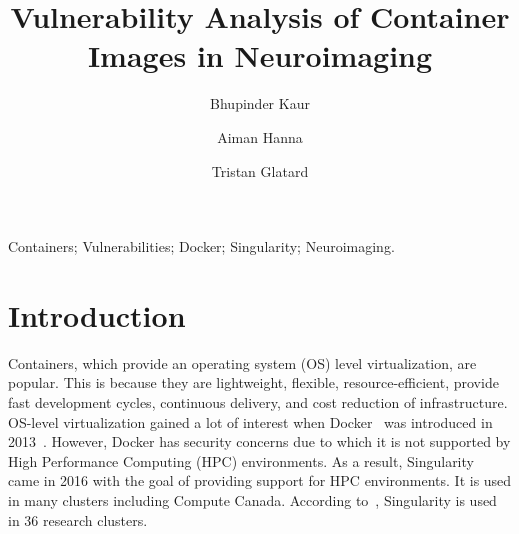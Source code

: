 \documentclass[a4paper,num-refs]{oup-contemporary}
\title{Vulnerability Analysis of Container Images in Neuroimaging}
\begin{document}
\author[1]{Bhupinder Kaur}
\author[1]{Aiman Hanna}
\author[1]{Tristan Glatard}


\maketitle

\begin{keywords}
Containers; Vulnerabilities; Docker; Singularity; Neuroimaging.
\end{keywords}


\section{Introduction}


Containers, which provide an operating system (OS) level virtualization, are
popular. This is because they are lightweight, flexible, resource-efficient,
provide fast development cycles, continuous delivery,
and cost reduction of infrastructure. OS-level virtualization gained a lot of interest when Docker~\cite{docker19} was
introduced in 2013~\cite{gantikow2016providing}. However, Docker has security concerns due to which it
is not supported by High Performance
Computing (HPC) environments. As a result, Singularity~\cite{singularity19} came in 2016 with the goal of providing support
for HPC environments. It is used in many clusters including Compute Canada.
According to~\cite{kurtzer2017singularity}, Singularity is used in 36 research clusters.

\end{document}
